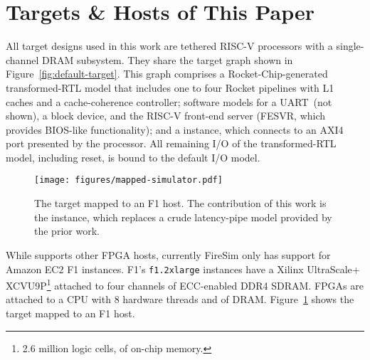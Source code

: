 \section{Targets \& Hosts of This Paper}\label{sec:targetandhostmachines}

All target designs used in this work are tethered RISC-V processors with a
single-channel DRAM subsystem.  They share the target graph shown in
Figure~\ref{fig:default-target}. This graph comprises a Rocket-Chip-generated
transformed-RTL model that includes one to four Rocket pipelines with L1 caches
and a cache-coherence controller; software models for a UART~(not shown),
a block device, and the RISC-V front-end server
(FESVR, which provides BIOS-like functionality); and a \PNAME instance,
which connects to an AXI4 port presented by the processor.  All remaining I/O
of the transformed-RTL model, including reset, is bound to the default I/O
model.

\begin{figure}[t]
    \centering
    \texttt{[image: figures/mapped-simulator.pdf]}
    \caption{The target mapped to an F1 host. The contribution of this work is
    the \PNAME instance, which replaces a crude latency-pipe model provided
    by the prior work.}
    \label{fig:mapped-simulator}
\end{figure}

While \SIMNAME supports other FPGA hosts, currently FireSim only has support for
Amazon EC2 F1 instances. F1's \texttt{f1.2xlarge} instances have a Xilinx
UltraScale+ XCVU9P\footnote{2.6 million logic cells,  of
on-chip memory.}
attached to four  channels of ECC-enabled DDR4 SDRAM.  FPGAs
are attached to a CPU with 8 hardware threads and  of
DRAM. Figure~\ref{fig:mapped-simulator} shows the target mapped to an F1 host.
